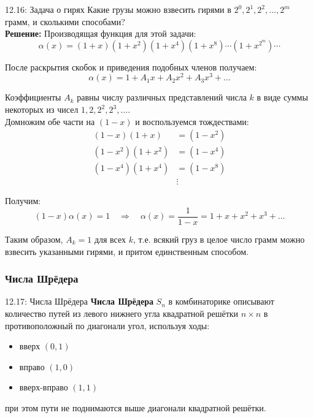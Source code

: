 \documentclass[a4paper,12pt]{article}
\begin{document}
	\begin{examplebox}{12.16: Задача о гирях}
		Какие грузы можно взвесить гирями в \(2^0, 2^1, 2^2, \dots, 2^m\) грамм, и сколькими способами?\\
		
		\textbf{Решение:} Производящая функция для этой задачи:
		\[ \alpha(x) = (1 + x)(1 + x^2)(1 + x^4)(1 + x^8)\cdots(1 + x^{2^m})\cdots \]
		
		После раскрытия скобок и приведения подобных членов получаем:
		\[ \alpha(x) = 1 + A_1 x + A_2 x^2 + A_3 x^3 + \dots \]
		
		Коэффициенты \(A_k\) равны числу различных представлений числа \(k\) в виде суммы некоторых из чисел \(1, 2, 2^2, 2^3, \dots\).\\
		
		Домножим обе части на \((1 - x)\) и воспользуемся тождествами:
		\begin{align*}
			(1 - x)(1 + x) &= (1 - x^2) \\
			(1 - x^2)(1 + x^2) &= (1 - x^4) \\
			(1 - x^4)(1 + x^4) &= (1 - x^8) \\
			&\vdots
		\end{align*}
		
		Получим:
		\[ (1 - x)\alpha(x) = 1 \quad\Rightarrow\quad \alpha(x) = \frac{1}{1 - x} = 1 + x + x^2 + x^3 + \dots \]
		
		Таким образом, \(A_k = 1\) для всех \(k\), т.е. всякий груз в целое число грамм можно взвесить указанными гирями, и притом единственным способом.
	\end{examplebox}
	
	\subsubsection{Числа Шрёдера}
	
	\begin{definitionbox}{12.17: Числа Шрёдера}
		\textbf{Числа Шрёдера} \(S_n\) в комбинаторике описывают количество путей из левого нижнего угла квадратной решётки \(n \times n\) в противоположный по диагонали угол, используя ходы:
		\begin{itemize}
			\item вверх \((0, 1)\)
			\item вправо \((1, 0)\)
			\item вверх-вправо \((1, 1)\)
		\end{itemize}
		при этом пути не поднимаются выше диагонали квадратной решётки.
	\end{definitionbox}
	
\end{document}
